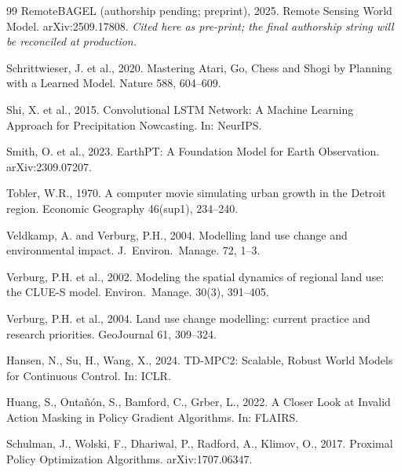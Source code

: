 \documentclass{article}
\begin{document}
\begin{thebibliography}{99}
RemoteBAGEL (authorship pending; preprint), 2025. Remote Sensing World Model. arXiv:2509.17808. \emph{Cited here as pre-print; the final authorship string will be reconciled at production.}

Schrittwieser, J. et al., 2020. Mastering Atari, Go, Chess and Shogi by Planning with a Learned Model. Nature 588, 604--609.

Shi, X. et al., 2015. Convolutional LSTM Network: A Machine Learning Approach for Precipitation Nowcasting. In: NeurIPS.

Smith, O. et al., 2023. EarthPT: A Foundation Model for Earth Observation. arXiv:2309.07207.

Tobler, W.R., 1970. A computer movie simulating urban growth in the Detroit region. Economic Geography 46(sup1), 234--240.

Veldkamp, A. and Verburg, P.H., 2004. Modelling land use change and environmental impact. J.~Environ.~Manage. 72, 1--3.

Verburg, P.H. et al., 2002. Modeling the spatial dynamics of regional land use: the CLUE-S model. Environ.~Manage. 30(3), 391--405.

Verburg, P.H. et al., 2004. Land use change modelling: current practice and research priorities. GeoJournal 61, 309--324.

Hansen, N., Su, H., Wang, X., 2024. TD-MPC2: Scalable, Robust World Models for Continuous Control. In: ICLR.

Huang, S., Onta\~{n}\'{o}n, S., Bamford, C., Grber, L., 2022. A Closer Look at Invalid Action Masking in Policy Gradient Algorithms. In: FLAIRS.

Schulman, J., Wolski, F., Dhariwal, P., Radford, A., Klimov, O., 2017. Proximal Policy Optimization Algorithms. arXiv:1707.06347.

\end{thebibliography}
\end{document}
